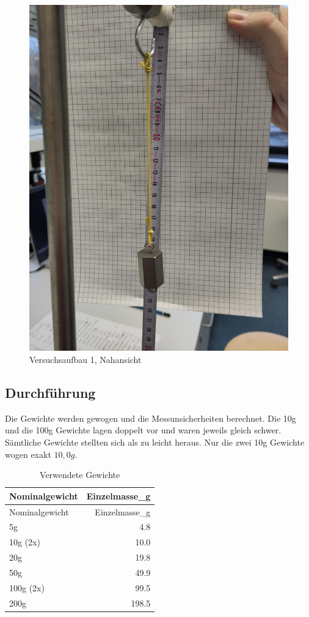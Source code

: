\documentclass[class=article, crop=false]{standalone}
\begin{document}
\begin{figure}
\centering
\includegraphics[width=\textwidth,height=0.2\textheight]{Bilder/V2B1.jpeg}
\caption{Versuchsaufbau 1, Nahansicht}
\end{figure}

\hypertarget{durchfuxfchrung}{%
\subsection{Durchführung}\label{durchfuxfchrung}}

Die Gewichte werden gewogen und die Messunsicherheiten berechnet. Die
10g und die 100g Gewichte lagen doppelt vor und waren jeweils gleich
schwer. Sämtliche Gewichte stellten sich als zu leicht heraus. Nur die
zwei 10g Gewichte wogen exakt \(10,0g\).

\begin{longtable}[]{@{}lr@{}}
\caption{Verwendete Gewichte}\tabularnewline
\toprule()
Nominalgewicht & Einzelmasse\_g \\
\midrule()
\endfirsthead
\toprule()
Nominalgewicht & Einzelmasse\_g \\
\midrule()
\endhead
5g & 4.8 \\
10g (2x) & 10.0 \\
20g & 19.8 \\
50g & 49.9 \\
100g (2x) & 99.5 \\
200g & 198.5 \\
\bottomrule()
\end{longtable}
\end{document}
